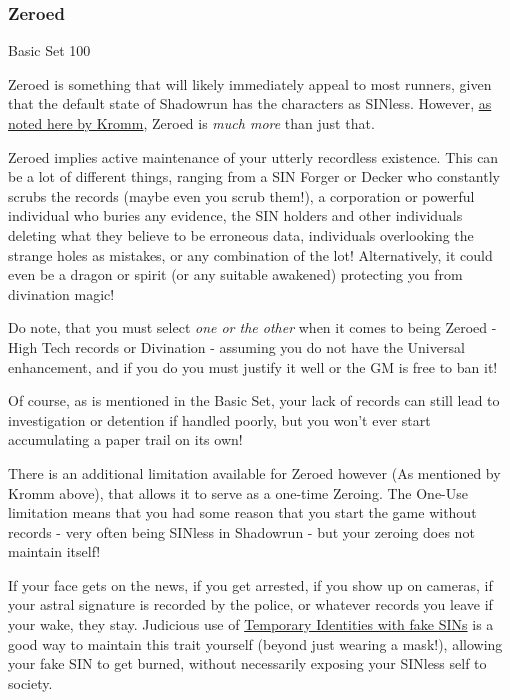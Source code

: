 \begin{multicols*}{3}
	\subsubsection*{Zeroed}\label{zeroed}
	\begin{flushright}
		Basic Set 100
	\end{flushright}
	
	Zeroed is something that will likely immediately appeal to most runners, given that the default state of Shadowrun has the characters as SINless. However, \textcolor{Blue}{\href{http://forums.sjgames.com/showpost.php?p=932347&postcount=35}{as noted here by Kromm}}, Zeroed is \textit{much more} than just that.
	
	Zeroed implies active maintenance of your utterly recordless existence. This can be a lot of different things, ranging from a SIN Forger or Decker who constantly scrubs the records (maybe even you scrub them!), a corporation or powerful individual who buries any evidence, the SIN holders and other individuals deleting what they believe to be erroneous data, individuals overlooking the strange holes as mistakes, or any combination of the lot! Alternatively, it could even be a dragon or spirit (or any suitable awakened) protecting you from divination magic!
	
	Do note, that you must select \textit{one or the other} when it comes to being Zeroed - High Tech records or Divination - assuming you do not have the Universal enhancement, and if you do you must justify it well or the GM is free to ban it! 
	
	Of course, as is mentioned in the Basic Set, your lack of records can still lead to investigation or detention if handled poorly, but you won't ever start accumulating a paper trail on its own!
	
	There is an additional limitation available for Zeroed however (As mentioned by Kromm above), that allows it to serve as a one-time Zeroing. The One-Use limitation means that you had some reason that you start the game without records - very often being SINless in Shadowrun - but your zeroing does not maintain itself! 
	
	If your face gets on the news, if you get arrested, if you show up on cameras, if your astral signature is recorded by the police, or whatever records you leave if your wake, they stay. Judicious use of \hyperref[fake_SINs]{Temporary Identities with fake SINs} is a good way to maintain this trait yourself (beyond just wearing a mask!), allowing your fake SIN to get burned, without necessarily exposing your SINless self to society.
	

\end{multicols*}
